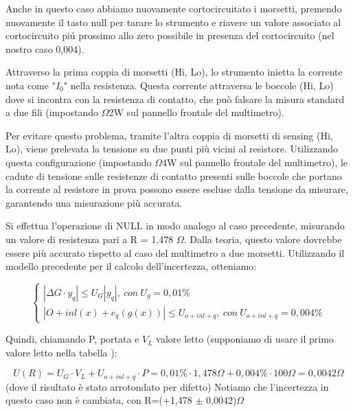 Anche in questo caso abbiamo nuovamente cortocircuitato i morsetti, premendo nuovamente il tasto null per tarare lo strumento e riavere un valore associato al cortocircuito pi\'u prossimo allo zero possibile in presenza del cortocircuito (nel nostro caso 0,004).


Attraverso la prima coppia di morsetti (Hi, Lo), lo strumento inietta la corrente nota come "$I_0$" nella resistenza. Questa corrente attraversa le boccole (Hi, Lo) dove si incontra con la resistenza di contatto, che può falsare la misura standard a due fili (impostando $\Omega$2W sul pannello frontale del multimetro).

Per evitare questo problema, tramite l'altra coppia di morsetti di sensing (Hi, Lo), viene prelevata la tensione su due punti più vicini al resistore. Utilizzando questa configurazione (impostando $\Omega$4W sul pannello frontale del multimetro), le cadute di tensione sulle resistenze di contatto presenti sulle boccole che portano la corrente al resistore in prova possono essere escluse dalla tensione da misurare, garantendo una misurazione più accurata.

Si effettua l'operazione di NULL in modo analogo al caso precedente, misurando un valore di resistenza pari a R = 1,478 $\Omega$. Dalla teoria, questo valore dovrebbe essere più accurato rispetto al caso del multimetro a due morsetti. Utilizzando il modello precedente per il calcolo dell'incertezza, otteniamo:

\begin{equation}
    \left\{\begin{array}{l}
| \Delta G \cdot y_q | \leq U_G |y_q|, \ con \ U_g=0,01\%
\\ | O + inl(x) + e_q(g(x)) | \leq U_{o+inl+q}, \ con \ U_{o+inl+q}=0,004\%
\end{array}\right.
\end{equation}


    


Quindi, chiamando P, portata e $V_L$ valore letto (supponiamo di usare il primo valore letto nella tabella \label{mult_port}):

\begin{equation*}
    U(R) = U_G \cdot V_L + U_{o+inl+q} \cdot P = 0,01\% \cdot 1,478\Omega + 0,004 \% \cdot 100 \Omega = 0,0042 \Omega 
\end{equation*}
(dove il risultato è stato arrotondato per difetto)
Notiamo che l’incertezza in questo caso non è cambiata, con R=(+1,478 $\pm$ 0,0042)$\Omega$



